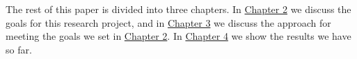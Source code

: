 The rest of this paper is divided into three chapters. In \hyperref[chp:Objectives]{Chapter 2} we discuss the goals for this research project, and in \hyperref[chp:Approach]{Chapter 3} we discuss the approach for meeting the goals we set in \hyperref[chp:Objectives]{Chapter 2}. In \hyperref[chp:Results]{Chapter 4} we show the results we have so far. 
\\

%
%
%			
